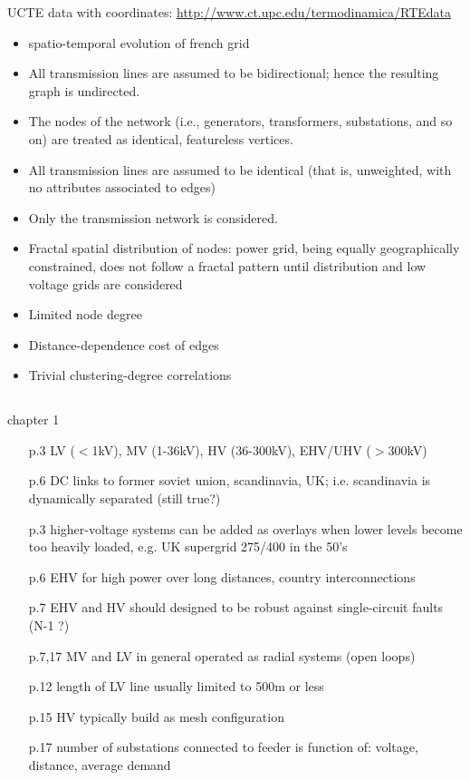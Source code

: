 \documentclass[paper=a4, fontsize=12pt]{article}
\begin{document}
UCTE data with coordinates:
\url{http://www.ct.upc.edu/termodinamica/RTEdata}

\begin{itemize}
\item spatio-temporal evolution of french grid

\item All transmission lines are assumed to be bidirectional; hence the resulting graph is undirected.
\item The nodes of the network (i.e., generators, transformers, substations, and so on) are treated as identical, featureless vertices.
\item All transmission lines are assumed to be identical (that is, unweighted, with no attributes associated to edges)
\item Only the transmission network is considered.

\item Fractal spatial distribution of nodes: power grid, being equally geographically constrained, does not follow a fractal pattern until distribution and low voltage grids are considered
\item Limited node degree
\item Distance-dependence cost of edges 
\item Trivial clustering-degree correlations
\end{itemize}

\subsection*{\citeauthor{Lakervi1995} \cite{Lakervi1995}}

chapter 1

\begin{itemize}
\item[p.3] LV ($<$1kV), MV (1-36kV), HV (36-300kV), EHV/UHV ($>$300kV) 
\item[p.6] DC links to former soviet union, scandinavia, UK; i.e. scandinavia is dynamically separated (still true?) 
\item[p.3] higher-voltage systems can be added as overlays when lower levels become too heavily loaded, e.g. UK supergrid 275/400 in the 50's 
\item[p.6] EHV for high power over long distances, country interconnections 
\item[p.7] EHV and HV should designed to be robust against single-circuit faults (N-1 ?) 
\item[p.7,17] MV and LV in general operated as radial systems (open loops)
\item[p.12] length of LV line usually limited to 500m or less 
\item[p.15] HV typically build as mesh configuration
\item[p.17] number of substations connected to feeder is function of: voltage, distance, average demand
\end{itemize}
\end{document}
